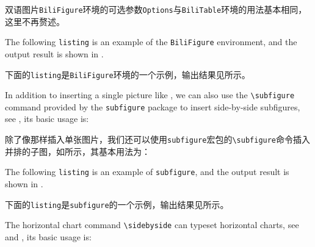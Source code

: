 \begin{ParaColumn}
    双语图片\verb"BiliFigure"环境的可选参数\verb"Options"与\verb"BiliTable"环境的用法基本相同，这里不再赘述。

    \switchcolumn*

    The following \verb"listing" is an example of the \verb"BiliFigure" environment, and the output result is shown in .

    \switchcolumn

    下面的\verb"listing"是\verb"BiliFigure"环境的一个示例，输出结果见所示。

    \CrossColumnText{
        
    }
    \switchcolumn*

    In addition to inserting a single picture like , we can also use the \verb"\subfigure" command provided by the \verb"subfigure" package to insert side-by-side subfigures, see , its basic usage is:

    \switchcolumn

    除了像那样插入单张图片，我们还可以使用\verb"subfigure"宏包的\verb"\subfigure"命令插入并排的子图，如所示，其基本用法为：

    \CrossColumnText{
        
        
    }
    \switchcolumn*

    The following \verb"listing" is an example of \verb"subfigure", and the output result is shown in .

    \switchcolumn
    
    下面的\verb"listing"是\verb"subfigure"的一个示例，输出结果见所示。

    \CrossColumnText{
        
    }

    The horizontal chart command \verb"\sidebyside" can typeset horizontal charts, see  and , its basic usage is:


\end{ParaColumn}
